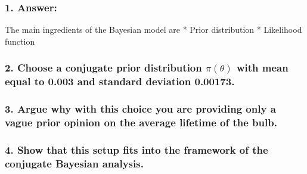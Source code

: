 \documentclass[
]{article}
\begin{document}
\hypertarget{answer-4}{%
\subsubsection{1. Answer:}\label{answer-4}}

The main ingredients of the Bayesian model are * Prior distribution *
Likelihood function

\hypertarget{choose-a-conjugate-prior-distribution-pitheta-with-mean-equal-to-0.003-and-standard-deviation-0.00173.}{%
\subsubsection{\texorpdfstring{2. Choose a conjugate prior distribution
\(\pi(\theta)\) with mean equal to 0.003 and standard deviation
0.00173.}{2. Choose a conjugate prior distribution \textbackslash pi(\textbackslash theta) with mean equal to 0.003 and standard deviation 0.00173.}}\label{choose-a-conjugate-prior-distribution-pitheta-with-mean-equal-to-0.003-and-standard-deviation-0.00173.}}

\hypertarget{argue-why-with-this-choice-you-are-providing-only-a-vague-prior-opinion-on-the-average-lifetime-of-the-bulb.}{%
\subsubsection{3. Argue why with this choice you are providing only a
vague prior opinion on the average lifetime of the
bulb.}\label{argue-why-with-this-choice-you-are-providing-only-a-vague-prior-opinion-on-the-average-lifetime-of-the-bulb.}}

\hypertarget{show-that-this-setup-fits-into-the-framework-of-the-conjugate-bayesian-analysis.}{%
\subsubsection{4. Show that this setup fits into the framework of the
conjugate Bayesian
analysis.}\label{show-that-this-setup-fits-into-the-framework-of-the-conjugate-bayesian-analysis.}}
\end{document}
